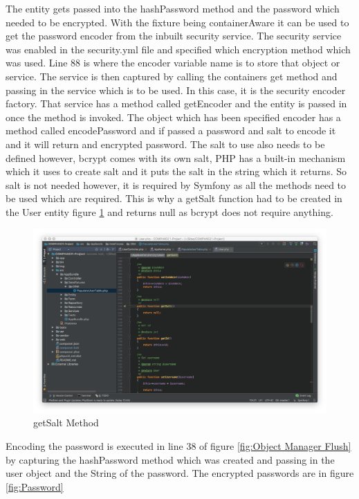 The entity gets passed into the hashPassword method and the password which needed to be encrypted. With the fixture being containerAware it can be used to get the password encoder from the inbuilt security service. The security service was enabled in the security.yml file and specified which encryption method which was used. Line 88 is where the encoder variable name is to store that object or service. The service is then captured by calling the containers get method and passing in the service which is to be used. In this case, it is the security encoder factory. That service has a method called getEncoder and the entity is passed in once the method is invoked. The object which has been specified encoder has a method called encodePassword and if passed a password and salt to encode it and it will return and encrypted password. The salt to use also needs to be defined however, bcrypt comes with its own salt, PHP has a built-in mechanism which it uses to create salt and it puts the salt in the string which it returns. So salt is not needed however, it is required by Symfony as all the methods need to be used which are required. This is why a getSalt function had to be created in the User entity figure \ref{fig:getSalt Method} and returns null as bcrypt does not require anything.

\begin{figure}[htbp]
   \centering
   \includegraphics[width=400pt]{figures/salt.png} %
   \caption{getSalt Method}
   \label{fig:getSalt Method}
\end{figure}

Encoding the password is executed in line 38 of figure \ref{fig:Object Manager Flush} by capturing the hashPassword method which was created and passing in the user object and the String of the password. The encrypted passwords are in figure \ref{fig:Password}

